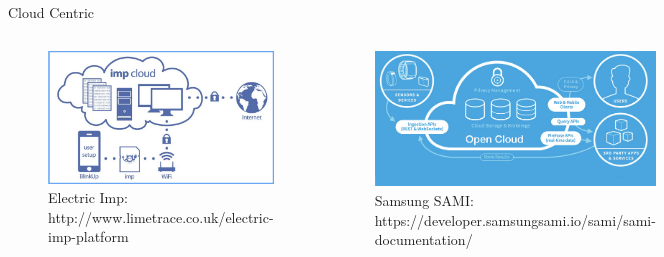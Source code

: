 \begin{frame}{Cloud Centric}
  \begin{columns}
    \begin{figure}
      \includegraphics[width=\textwidth]{figures/cloud1.png}
      \captionsetup{labelformat=empty}
      \caption{Electric Imp: http://www.limetrace.co.uk/electric-imp-platform}
    \end{figure}

    \begin{figure}
      \includegraphics[width=\textwidth]{figures/cloud2.png}
      \captionsetup{labelformat=empty}
      \caption{Samsung SAMI: https://developer.samsungsami.io/sami/sami-documentation/}
    \end{figure}

    \begin{figure}
      \includegraphics[width=\textwidth]{figures/cloud3.png}
      \captionsetup{labelformat=empty}
      \caption{Ninja Sphere: http://lucept.files.wordpress.com/2012/06/ninja-blocks-capture.jpg}
    \end{figure}
\end{columns}
\end{frame}

